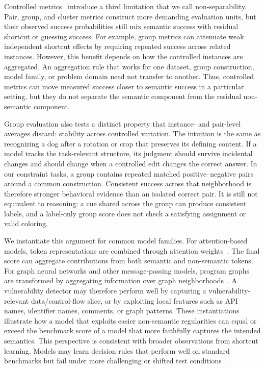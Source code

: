 \documentclass[acmsmall,screen,review,anonymous]{acmart}
\begin{document}
Controlled metrics~\cite{VDCL:Ding:2024,Zhang2026SAT} introduce a 
third limitation that we call
non-separability. Pair, group, and cluster metrics construct more demanding
evaluation units, but their observed success probabilities still mix semantic
success with residual shortcut or guessing success. For example, group
metrics can attenuate weak independent shortcut effects by requiring repeated
success across related instances. However, this benefit depends on how the
controlled instances are aggregated. An aggregation rule that works for one
dataset, group construction, model family, or problem domain need not
transfer to another. Thus, controlled metrics can move measured success
closer to semantic success in a particular setting, but they do not separate
the semantic component from the residual non-semantic component.

Group evaluation also tests a distinct property that instance- and pair-level
averages discard: stability across controlled variation. The intuition is the
same as recognizing a dog after a rotation or crop that preserves its defining
content. If a model tracks the task-relevant structure, its judgment should
survive incidental changes and should change when a controlled edit changes
the correct answer. In our constraint tasks, a group contains repeated matched
positive--negative pairs around a common construction. Consistent success
across that neighborhood is therefore stronger behavioral evidence than an
isolated correct pair. It is still not equivalent to reasoning: a cue shared
across the group can produce consistent labels, and a label-only group score
does not check a satisfying assignment or valid coloring.


We instantiate this argument for common model families. For attention-based
models, token representations are combined through attention
weights~\cite{Vaswani2017Attention}. The final score can aggregate
contributions from both semantic and non-semantic tokens. For graph neural
networks and other message-passing models, program graphs are transformed by
aggregating information over graph neighborhoods~\cite{KipfWelling2017GCN}.
A vulnerability detector may therefore perform well by capturing a
vulnerability-relevant data/control-flow slice, or by exploiting local
features such as API names, identifier names, comments, or graph patterns.
These instantiations illustrate how a model that exploits easier
non-semantic regularities can equal or exceed the benchmark score of a model
that more faithfully captures the intended semantics. This perspective is
consistent with broader observations from shortcut learning. Models may
learn decision rules that perform well on standard benchmarks but fail under
more challenging or shifted test conditions~\cite{Geirhos2020Shortcut}.
\end{document}
